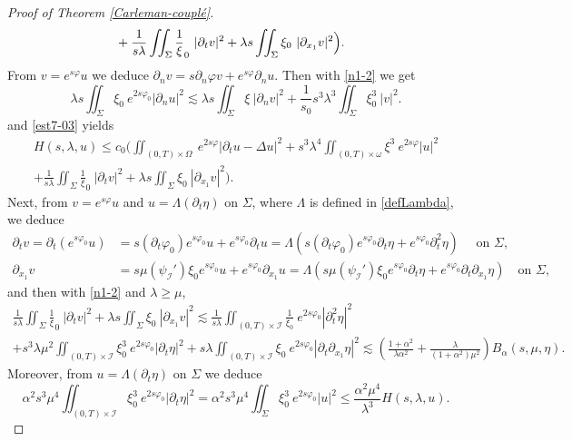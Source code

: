 \documentclass[a4paper, 12pt]{article}
\theoremstyle{plain}
\theoremstyle{definition}
\numberwithin{theorem}{section}
\numberwithin{equation}{section}
\begin{document}
{\begin{proof}[Proof of Theorem \ref{Carleman-couplé}]
\begin{align}
   & + \frac{1}{s\lambda}\iint_\Sigma\frac1\xi_0~|\partial_tv|^2+\lambda s\iint_\Sigma\xi_0~|\partial_{x_1} v|^2\Big).\notag
\end{align}
From $v=e^{s\varphi}u$ we deduce $\partial_n v= s\partial_n \varphi v+e^{s\varphi} \partial_n u$. Then with \eqref{n1-2} we get
$$
\lambda s\iint_\Sigma\xi_0~e^{2s\varphi_0}|\partial_n u|^2\lesssim \lambda s\iint_\Sigma\xi~|\partial_n v|^2+\frac{1}{s_0}s^3\lambda^3 \iint_\Sigma\xi_0^3~|v|^2.
$$
and \eqref{est7-03} yields
\begin{multline}\label{EstH-1}
H(s, \lambda, u) \leq c_0 
   \Big(\iint_{(0,T)\times\Omega}~e^{2s\varphi}|\partial_tu-\Delta u|^2+s^3\lambda^4\iint_{(0,T)\times\omega} \xi^3~e^{2s\varphi}| u|^2 \\
   + \frac{1}{s\lambda}\iint_\Sigma\frac1\xi_0~|\partial_tv|^2+\lambda s\iint_\Sigma\xi_0~|\partial_{x_1} v|^2\Big).
\end{multline}
Next, from $v=e^{s\varphi}u$ and $u=\Lambda (\partial_t\eta)$ on $\Sigma$, where $\Lambda$ is defined in \eqref{defLambda}, we deduce 
\begin{align*}
\partial_tv=\partial_t (e^{s\varphi_0}u)&= s(\partial_t \varphi_0) e^{s\varphi_0}u+e^{s\varphi_0} \partial_t u=\Lambda(s(\partial_t \varphi_0) e^{s\varphi_0}\partial_t \eta+e^{s\varphi_0} \partial_t^2 \eta)\quad \mbox{ on $\Sigma$,}\\
\partial_{x_1} v&= s \mu (\psi_{\mathcal{I}}')\xi_0 e^{s\varphi_0}u+e^{s\varphi_0}\partial_{x_1}u= \Lambda(s \mu (\psi_{\mathcal{I}}')\xi_0 e^{s\varphi_0}\partial_t \eta+e^{s\varphi_0}\partial_t\partial_{x_1} \eta)\quad \mbox{on $\Sigma$,}
\end{align*}
and then with \eqref{n1-2} and $\lambda\geq \mu$,
\begin{multline}\label{Est8-03}
\frac{1}{s\lambda}\iint_\Sigma\frac1\xi_0~|\partial_tv|^2+\lambda s\iint_\Sigma\xi_0~|\partial_{x_1} v|^2\lesssim  \frac{1}{s\lambda}\iint_{(0,T)\times \mathcal{I}}  \frac{1}{\xi_0}~e^{2s\varphi_0}|\partial_t^2 \eta|^2\\
+s^3\lambda \mu^2 \iint_{(0,T)\times \mathcal{I}}  \xi_0^3~e^{2s\varphi_0}|\partial_t \eta|^2+s\lambda \iint_{(0,T)\times \mathcal{I}}  \xi_0~e^{2s\varphi_0}|\partial_t\partial_{x_1} \eta|^2\lesssim \left(\frac{1+\alpha^2}{\lambda \alpha^2}+\frac{\lambda}{(1+\alpha^2)\mu^2}\right) B_\alpha(s, \mu, \eta).
\end{multline}
Moreover, from  $u=\Lambda (\partial_t\eta)$ on $\Sigma$ we deduce 
\begin{equation}\label{Eq21-04}
\alpha^2s^3\mu^4\iint_{(0,T)\times\mathcal{I}}\xi_0^3~ e^{2s\varphi_0}|\partial_t\eta|^2=\alpha^2 s^3\mu^4\iint_{\Sigma}\xi_0^3~ e^{2s\varphi_0}|u|^2\leq \frac{\alpha^2 \mu^4}{\lambda^3}H(s, \lambda, u).

\end{equation}
\end{proof}}
\end{document}
